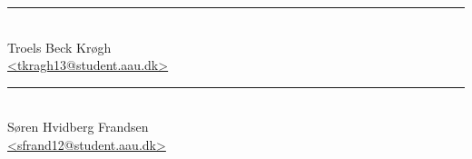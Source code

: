 \noindent
\begin{minipage}[b]{0.45\textwidth}
    \centering
    \rule{\textwidth}{0.5pt}\\
    Troels Beck Krøgh\\
    {\footnotesize \href{mailto:tkragh13@student.aau.dk}{<tkragh13@student.aau.dk>}}
\end{minipage}
\hfill
\begin{minipage}[b]{0.45\textwidth}
    \centering
    \rule{\textwidth}{0.5pt}\\
    Søren Hvidberg Frandsen\\
    {\footnotesize \href{mailto:sfrand12@student.aau.dk}{<sfrand12@student.aau.dk>}}
\end{minipage}\\
